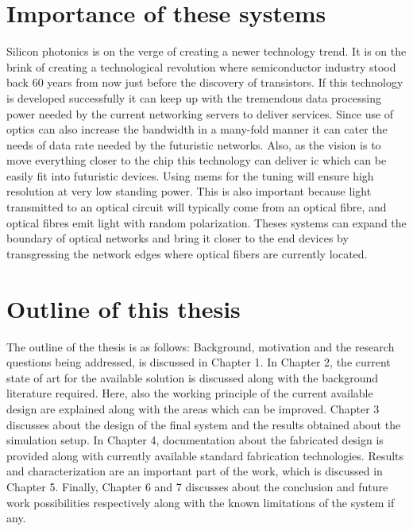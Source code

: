 \documentclass[../report.tex]{subfiles}
\begin{document}
	\section{Importance of these systems}
Silicon photonics is on the verge of creating a newer technology trend. It is on the brink of creating a technological revolution where semiconductor industry stood back 60 years from now just before the discovery of transistors. If this technology is developed successfully it can keep up with the tremendous data processing power needed by the current networking servers to deliver services. Since use of optics can also increase the bandwidth in a many-fold manner it can cater the needs of data rate needed by the futuristic networks. Also, as the vision is to move everything closer to the chip this technology can deliver \gls{ic} which can be easily fit into futuristic devices. Using \gls{mems} for the tuning will ensure high resolution at very low standing power. This is also important because light transmitted to an optical circuit will typically come from an optical fibre, and optical fibres emit light with random polarization. Theses systems can expand the boundary of optical networks and bring it closer to the end devices by transgressing the network edges where optical fibers are currently located.
	
	\section{Outline of this thesis}
The outline of the thesis is as follows: Background, motivation and the research questions being addressed, is discussed in Chapter 1. In Chapter 2, the current state of art for the available solution is discussed along with the background literature required. Here, also the working principle of the current available design are explained along with the areas which can be improved. Chapter 3 discusses about the design of the final system and the results obtained about the simulation setup. In Chapter 4, documentation about the fabricated design is provided along with currently available standard fabrication technologies. Results and characterization are an important part of the work, which is discussed in Chapter 5. Finally, Chapter 6 and 7 discusses about the conclusion and future work possibilities respectively along with the known limitations of the system if any.  
	
\end{document}
